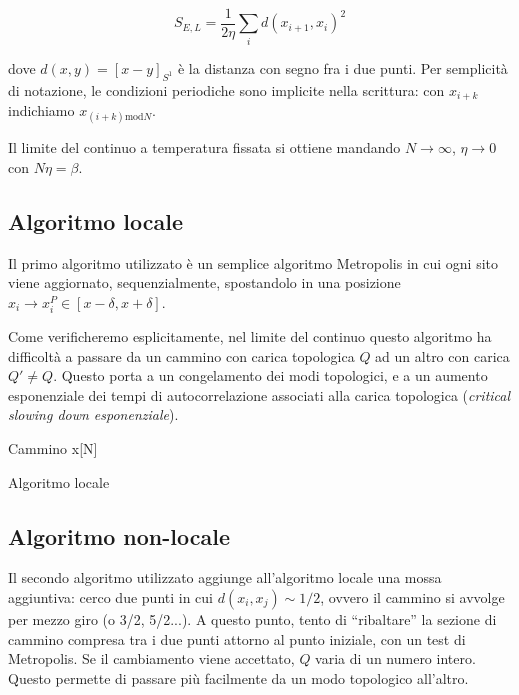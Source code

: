 \documentclass[a4paper,11pt]{article}
\begin{document}
    \begin{equation}
        S_{E,L} = \frac{1}{2\eta} \sum_i d(x_{i+1}, x_{i})^2
    \end{equation}
    
    dove $d(x,y) = [x - y]_{S^1}$ è la distanza con segno fra i due punti. Per semplicità di notazione, le condizioni periodiche sono implicite nella scrittura: con $x_{i+k}$ indichiamo $x_{(i + k) \mathrm{mod} N}$.
    
    Il limite del continuo a temperatura fissata si ottiene mandando $N \to \infty$, $\eta \to 0$ con $N\eta = \beta$.
    
    
    \subsection{Algoritmo locale}
    
    Il primo algoritmo utilizzato è un semplice algoritmo Metropolis in cui ogni sito viene aggiornato, sequenzialmente, spostandolo in una posizione $x_i \to x^P_i \in [x - \delta, x + \delta]$.
    
    Come verificheremo esplicitamente, nel limite del continuo questo algoritmo ha difficoltà a passare da un cammino con carica topologica $Q$ ad un altro con carica $Q' \neq Q$. Questo porta a un congelamento dei modi topologici, e a un aumento esponenziale dei tempi di autocorrelazione associati alla carica topologica (\emph{critical slowing down esponenziale}).
    
    \begin{algorithm}[H]
    Cammino x[N]\;
    \caption{Algoritmo locale}
    \label{alg:local}
    \end{algorithm}
    
    \subsection{Algoritmo non-locale}
    
    Il secondo algoritmo utilizzato aggiunge all'algoritmo locale una mossa aggiuntiva: cerco due punti in cui $d(x_i, x_j) \sim 1/2$, ovvero il cammino si avvolge per mezzo giro (o 3/2, 5/2...). A questo punto, tento di ``ribaltare'' la sezione di cammino compresa tra i due punti attorno al punto iniziale, con un test di Metropolis. Se il cambiamento viene accettato, $Q$ varia di un numero intero. Questo permette di passare più facilmente da un modo topologico all'altro.
\end{document}
